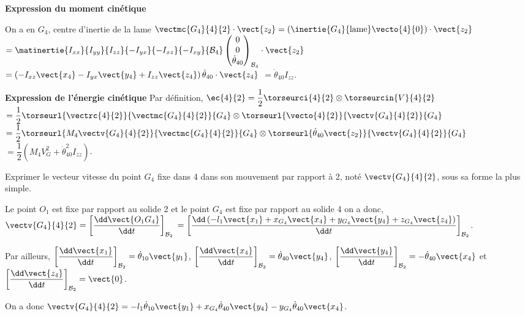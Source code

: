\documentclass[11pt]{article}
\begin{document}
\begin{UPSTIcorrige}
\textbf{Expression du moment cinétique}

On a en $G_4$, centre d'inertie de la lame $\vectmc{G_4}{4}{2}\cdot \vect{z_2} = \left(\inertie{G_4}{\text{lame}}\vecto{4}{0}\right) \cdot\vect{z_2}$ 
$ = \matinertie{I_{xx}}{I_{yy}}{I_{zz}}{-I_{yx}}{-I_{xz}}{-I_{xy}}{\mathcal{B}_4} 
\begin{pmatrix} 0 \\ 0 \\ \dot{\theta}_{40} \end{pmatrix}_{\mathcal{B}_4} \cdot\vect{z_2}
$
$= \left(-I_{xz} \vect{x_4}-I_{yx} \vect{y_4}+I_{zz} \vect{z_4}\right)\dot{\theta}_{40} \cdot \vect{z_4}$
$= \dot{\theta}_{40}  I_{zz}$.

\textbf{Expression de l'énergie cinétique}
Par définition, $\ec{4}{2} = \dfrac{1}{2}\torseurci{4}{2} \otimes \torseurcin{V}{4}{2}$
$ = \dfrac{1}{2}\torseurl{\vectrc{4}{2}}{\vectmc{G_4}{4}{2}}{G_4} \otimes \torseurl{\vecto{4}{2}}{\vectv{G_4}{4}{2}}{G_4} $
$ = \dfrac{1}{2}\torseurl{M_4 \vectv{G_4}{4}{2}}{\vectmc{G_4}{4}{2}}{G_4} \otimes \torseurl{\dot{\theta}_{40}\vect{z_2}}{\vectv{G_4}{4}{2}}{G_4} $
$ = \dfrac{1}{2} \left(M_4 V_G^2 +\dot{\theta}_{40}^2  I_{zz} \right)$.

\end{UPSTIcorrige}



\UPSTIquestion  Exprimer le vecteur vitesse du point $G_4$ fixe dans 4 dans son mouvement par rapport à 2, noté $\vectv{G_4}{4}{2}$, sous sa forme la plus simple.

\begin{UPSTIcorrige}
Le point $O_1$ est fixe par rapport au solide 2 et le point $G_4$ est fixe par rapport au solide 4 on a donc, $\vectv{G_4}{4}{2} =\left[ \dfrac{\dd \vect{O_1 G_4}}{\dd t} \right]_{\mathcal{B}_2} $
$ = \left[\dfrac{\dd\left(-l_1 \vect{x_1} +  x_{G_4} \vect{x_4}+ y_{G_4} \vect{y_4}+ z_{G_4} \vect{z_4}\right) }{\dd t}\right]_{\mathcal{B}_2} $.

Par ailleurs, $\left[\dfrac{\dd \vect{x_1}}{\dd t}\right]_{\mathcal{B}_2}=\dot{\theta}_{10} \vect{y_1}$, 
$\left[\dfrac{\dd \vect{x_4}}{\dd t}\right]_{\mathcal{B}_2}=\dot{\theta}_{40} \vect{y_4}$, 
$\left[\dfrac{\dd \vect{y_4}}{\dd t}\right]_{\mathcal{B}_2}=-\dot{\theta}_{40}\vect{x_4}$ et
$\left[\dfrac{\dd \vect{z_4}}{\dd t}\right]_{\mathcal{B}_2}= \vect{0}$.

On a donc $\vectv{G_4}{4}{2} =-l_1\dot{\theta}_{10} \vect{y_1} +  x_{G_4} \dot{\theta}_{40} \vect{y_4}- y_{G_4} \dot{\theta}_{40} \vect{x_4}$.

\end{UPSTIcorrige}
\end{document}
